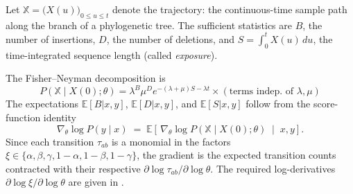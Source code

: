 \documentclass[11pt]{article}
\newcommand{\E}{\mathbb{E}}
\newcommand{\ins}{\lambda}
\newcommand{\del}{\mu}
\begin{document}
Let $\mathbb{X}=\bigl(X(u)\bigr)_{0\le u\le t}$ denote the trajectory: the continuous-time sample path along the branch of a phylogenetic tree.
The sufficient statistics are $B$, the number of insertions, $D$, the number of deletions, and $S=\int_0^t X(u)\,du$, the time-integrated sequence length (called \emph{exposure}).

The Fisher--Neyman decomposition is
\begin{equation*}
P(\mathbb{X}\mid X(0);\theta) = \ins^B \del^D e^{-(\ins+\del) S - \ins t} \times (\mbox{terms indep. of $\ins,\del$})
\end{equation*}
The expectations $\E[B|x,y]$, $\E[D|x,y]$, and $\E[S|x,y]$ follow from the score-function identity
\begin{equation}
\label{eq:score}
\nabla_\theta \log P(y\mid x)
  \;=\; \E\!\left[\,\nabla_\theta \log P(\mathbb{X}\mid X(0);\theta)
        \;\middle|\; x,y\right].
\end{equation}
Since each transition $\tau_{ab}$ is a monomial in the factors $\xi \in \{ \alpha,\beta,\gamma,1-\alpha,1-\beta,1-\gamma\}$, the
gradient is the expected transition counts contracted with
their respective $\partial \log \tau_{ab} / \partial \log \theta$.
The required log-derivatives $\partial\log\xi/\partial\log\theta$ are given in
.
\end{document}

